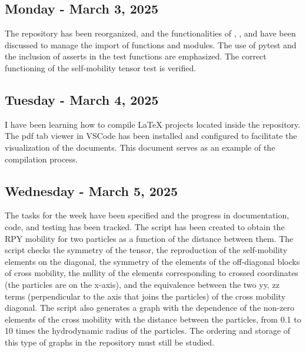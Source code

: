 \documentclass[12pt]{article} %
\begin{document}
\subsection{Monday - March 3, 2025}
The repository has been reorganized, and the functionalities of , ,
and  have been discussed to manage the import of functions and modules. 
The use of pytest and the inclusion of asserts in the test functions are emphasized. 
The correct functioning of the self-mobility tensor test is verified.

\subsection{Tuesday - March 4, 2025}
I have been learning how to compile LaTeX projects located inside the repository.
The pdf tab viewer in VSCode has been installed and configured to facilitate the 
visualization of the documents. This document serves as an example of the compilation 
process.

\subsection{Wednesday - March 5, 2025}
The tasks for the week have been specified and the progress in documentation, code, and testing has been tracked.
The script  has been created to obtain 
the RPY mobility for two particles as a function of the distance 
between them. The script checks the symmetry of the tensor, the 
reproduction of the self-mobility elements on the diagonal, the 
symmetry of the elements of the off-diagonal blocks of cross mobility,
the nullity of the elements corresponding to crossed coordinates 
(the particles are on the x-axis), and the equivalence between the 
two yy, zz terms (perpendicular to the axis that joins the particles) 
of the cross mobility diagonal. The script also generates a graph
with the dependence of the non-zero elements of the cross mobility
with the distance between the particles, from 0.1 to 10 times the
hydrodynamic radius of the particles. The ordering and storage of
this type of graphs in the repository must still be studied.
\end{document}
